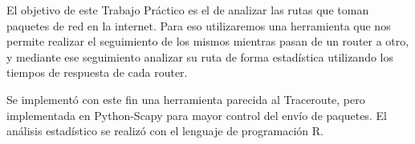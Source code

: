 El objetivo de este Trabajo Práctico es el de analizar las rutas que toman paquetes de red
en la internet. Para eso utilizaremos una herramienta que nos 
permite realizar el seguimiento de los mismos mientras pasan de un router a otro,
y mediante ese seguimiento analizar su ruta
de forma estadística utilizando los tiempos de respuesta de cada router.

Se implementó con este fin una herramienta parecida al Traceroute,
pero implementada en Python-Scapy para mayor control del envío de 
paquetes. El análisis estadístico se realizó con el lenguaje de programación R.
